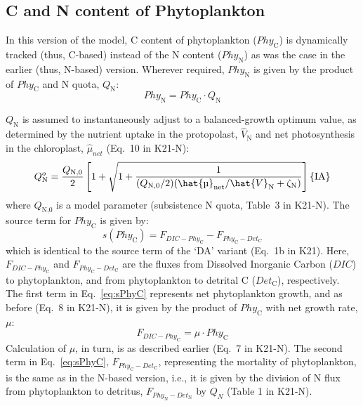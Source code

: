 \documentclass[gmd, manuscript]{copernicus}
\begin{document}
\subsection{C and N content of Phytoplankton}
In this version of the model, C content of phytoplankton ($Phy_\text{C}$) is dynamically tracked (thus, C-based) instead of the N content ($Phy_\text{N}$) as was the case in the earlier (thus, N-based) version. Wherever required, $Phy_\text{N}$ is given by the product of $Phy_\text{C}$ and N quota, $Q_\text{N}$:
\begin{equation} \label{eq:Q}
Phy_\text{N} = Phy_\text{C} \cdot Q_\text{N}  
\end{equation}

$Q_\text{N}$ is assumed to instantaneously adjust to a balanced-growth optimum value, as determined by the nutrient uptake in the protopolast, $\hat{V}_\text{N}$ and net photosynthesis in the chloroplast, $\hat{\mu}_{net}$ (Eq.~10 in K21-N):
\begin{equation}\label{eq:Qopt}
 Q_\text{N}^o= \frac{Q_\text{N,0}}{2} \left[1+\sqrt{1+\frac{1}{(Q_\text{N,0}/2){({\hat{\mu}_{\text{net}}}/{\hat{V}_\text{N}}+\zeta_\text{N} )}}} \right] \hfill \{\text{IA}\}
\end{equation}
where $Q_\text{N,0}$ is a model parameter (subsistence N quota, Table~3 in K21-N). The source term for $Phy_\text{C}$ is given by:
\begin{equation} \label{eq:sPhyC}
s(Phy_{\text{C}}) = F_{DIC-Phy_\text{C}} - F_{Phy_{\text{C}}-Det_{\text{C}}}
\end{equation}
which is identical to the source term of the `DA' variant (Eq.~1b in K21). Here, $F_{DIC-Phy_\text{C}}$ and $F_{Phy_{\text{C}}-Det_{\text{C}}}$ are the fluxes from Dissolved Inorganic Carbon ($DIC$) to phytoplankton, and from phytoplankton to detrital C ($Det_\text{C}$), respectively. The first term in Eq.~\ref{eq:sPhyC} represents net phytoplankton growth, and as before (Eq.~8 in K21-N), it is given by the product of $Phy_\text{C}$ with net growth rate, $\mu$: 
\begin{equation} \label{eq:fdicphyc}
 F_{DIC-Phy_\text{C}} = \mu \cdot Phy_\text{C}
\end{equation}
Calculation of $\mu$, in turn, is as described earlier (Eq.~7 in K21-N). The second term in Eq.~\ref{eq:sPhyC}, $F_{Phy_\text{C}-Det_\text{C}}$, representing the mortality of phytoplankton, is the same as in the N-based version, i.e., it is given by the division of N flux from phytoplankton to detritus, $F_{Phy_\text{N}-Det_\text{N}}$ by $Q_N$ (Table 1 in K21-N).
\end{document}
